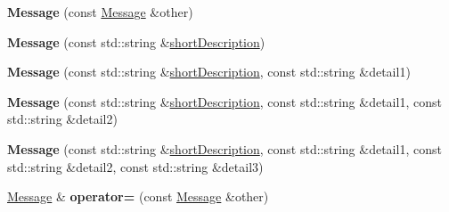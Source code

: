 \begin{DoxyCompactItemize}
\item 
\hypertarget{class_message_ad253b20930e70257e2523bb9fc7d299c}{{\bfseries Message} (const \hyperlink{class_message}{Message} \&other)}\label{class_message_ad253b20930e70257e2523bb9fc7d299c}

\item 
\hypertarget{class_message_aad17a05b7c2d5f1ef207f7150691a03a}{{\bfseries Message} (const std\+::string \&\hyperlink{class_message_a9bd82d96b57df5c4615b6cbbf318175a}{short\+Description})}\label{class_message_aad17a05b7c2d5f1ef207f7150691a03a}

\item 
\hypertarget{class_message_ab77d28861db855dadef024529aab07d8}{{\bfseries Message} (const std\+::string \&\hyperlink{class_message_a9bd82d96b57df5c4615b6cbbf318175a}{short\+Description}, const std\+::string \&detail1)}\label{class_message_ab77d28861db855dadef024529aab07d8}

\item 
\hypertarget{class_message_ae8c66f7de0811d86765369a4c430bb6c}{{\bfseries Message} (const std\+::string \&\hyperlink{class_message_a9bd82d96b57df5c4615b6cbbf318175a}{short\+Description}, const std\+::string \&detail1, const std\+::string \&detail2)}\label{class_message_ae8c66f7de0811d86765369a4c430bb6c}

\item 
\hypertarget{class_message_a65fcd0b70c65cf7b9b9de390386cef79}{{\bfseries Message} (const std\+::string \&\hyperlink{class_message_a9bd82d96b57df5c4615b6cbbf318175a}{short\+Description}, const std\+::string \&detail1, const std\+::string \&detail2, const std\+::string \&detail3)}\label{class_message_a65fcd0b70c65cf7b9b9de390386cef79}

\item 
\hypertarget{class_message_a46c4e793523c80a79ab12e4e7d7c54e5}{\hyperlink{class_message}{Message} \& {\bfseries operator=} (const \hyperlink{class_message}{Message} \&other)}\label{class_message_a46c4e793523c80a79ab12e4e7d7c54e5}


\end{DoxyCompactItemize}
